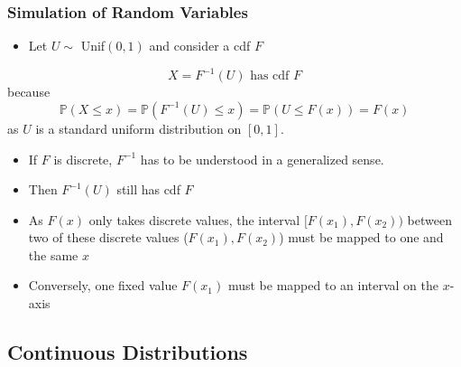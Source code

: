 \subsubsection{Simulation of Random Variables}

\begin{itemize}
    \item Let $U\sim$ Unif$(0,1)$ and consider a cdf $F$
\end{itemize}
\begin{equation*}
    X=F^{-1}(U) \text{ has cdf }F
\end{equation*}
because
\begin{equation*}
    \mathbb{P}(X\leq x)=\mathbb{P}(F^{-1}(U)\leq x)=\mathbb{P}(U\leq F(x))=F(x)
\end{equation*}
as $U$ is a standard uniform distribution on $[0,1]$.


\begin{itemize}
    \item If $F$ is discrete, $F^{-1}$ has to be understood in a generalized sense.
    \item Then $F^{-1}(U)$ still has cdf $F$
    \item As $F(x)$ only takes discrete values, the interval $[F(x_1), F(x_2))$ between two of these discrete values ($F(x_1), F(x_2)$) must be mapped to one and the same $x$
    \item Conversely, one fixed value $F(x_1)$ must be mapped to an interval on the $x$-axis
\end{itemize}

\subsection{Continuous Distributions}
